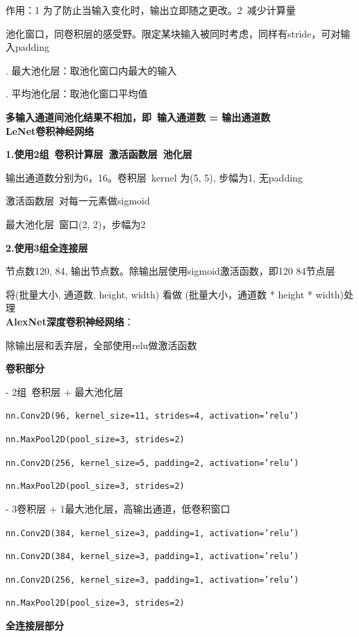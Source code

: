 \documentclass[UTF8]{ctexart}
\begin{document}
  作用：1 为了防止当输入变化时，输出立即随之更改。2\ 减少计算量

  池化窗口，同卷积层的感受野。限定某块输入被同时考虑，同样有stride，可对输入padding

  . 最大池化层：取池化窗口内最大的输入

  . 平均池化层：取池化窗口平均值

  \textbf{多输入通道间池化结果不相加，即\ 输入通道数 = 输出通道数}\\
\textbf{LeNet卷积神经网络}

  \textbf{1.使用2组\ 卷积计算层\ 激活函数层\ 池化层}

  \quad 输出通道数分别为6，16。卷积层\ kernel 为(5, 5), 步幅为1, 无padding

  \quad 激活函数层\ 对每一元素做sigmoid

  \quad 最大池化层\ 窗口(2, 2)，步幅为2

  \textbf{2.使用3组全连接层}

  \quad 节点数120, 84, 输出节点数。除输出层使用sigmoid激活函数，即120 84节点层

  \quad 将(批量大小, 通道数, height, width) 看做 (批量大小，通道数 * height * width)处理\\
\textbf{AlexNet深度卷积神经网络}：

  除输出层和丢弃层，全部使用relu做激活函数

  \textbf{卷积部分}
  
  \quad - 2组\ 卷积层 + 最大池化层
  
  \quad \texttt{nn.Conv2D(96, kernel\_size=11, strides=4, activation='relu')}

  \quad \texttt{nn.MaxPool2D(pool\_size=3, strides=2)}

  \quad \texttt{nn.Conv2D(256, kernel\_size=5, padding=2, activation='relu')}

  \quad \texttt{nn.MaxPool2D(pool\_size=3, strides=2)}
  
  \quad - 3卷积层 + 1最大池化层，高输出通道，低卷积窗口
  
  \quad \texttt{nn.Conv2D(384, kernel\_size=3, padding=1, activation='relu')}
  
  \quad \texttt{nn.Conv2D(384, kernel\_size=3, padding=1, activation='relu')} 
  
  \quad \texttt{nn.Conv2D(256, kernel\_size=3, padding=1, activation='relu')}
  
  \quad \texttt{nn.MaxPool2D(pool\_size=3, strides=2)}

  \textbf{全连接层部分}
  
\end{document}
